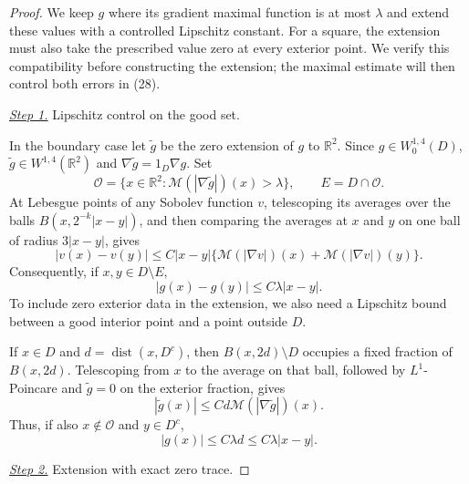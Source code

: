 \documentclass{smfart}
\theoremstyle{definition}
\newcommand{\1}{\mathbf 1}
\begin{document}
\begin{proof}
We keep $g$ where its gradient maximal function is at most $\lambda$
and extend these values with a controlled Lipschitz constant.  For a
square, the extension must also take the prescribed value zero at every
exterior point.  We verify this compatibility before constructing the
extension; the maximal estimate will then control both errors in (28).

\smallskip\noindent
\underline{\textit{Step 1.}} Lipschitz control on the good set.

In the boundary case let $\widetilde g$ be the zero extension of $g$
to $\mathbb R^2$.  Since $g\in W^{1,4}_ 0(D)$,
$\widetilde g\in W^{1,4}(\mathbb R^2)$ and
$\nabla\widetilde g=1_ D\nabla g$.  Set
\begin{equation*}
\mathcal O=\{x\in\mathbb R^2:
\mathcal M(|\nabla\widetilde g|)(x)>\lambda\},\qquad
E=D\cap\mathcal O.
\end{equation*}
At Lebesgue points of any Sobolev function $v$, telescoping its averages
over the balls $B(x,2^{-k}|x-y|)$, and then comparing the averages at
$x$ and $y$ on one ball of radius $3|x-y|$, gives
\begin{equation*}
|v(x)-v(y)|\leq C|x-y|
\{\mathcal M(|\nabla v|)(x)+\mathcal M(|\nabla v|)(y)\}.
\end{equation*}
Consequently, if $x,y\in D\setminus E$,
\begin{equation}
|g(x)-g(y)|\leq C\lambda|x-y|.
\tag{28a}
\end{equation}
To include zero exterior data in the extension, we also need a
Lipschitz bound between a good interior point and a point outside $D$.

If $x\in D$ and $d=\operatorname {dist}(x,D^c)$, then
$B(x,2d)\setminus D$ occupies a fixed fraction of $B(x,2d)$.
Telescoping from $x$ to the average on that ball, followed by
$L^1$-Poincare and $\widetilde g=0$ on the exterior fraction, gives
\begin{equation*}
|\widetilde g(x)|\leq Cd\mathcal M(|\nabla\widetilde g|)(x).
\end{equation*}
Thus, if also $x\notin\mathcal O$ and $y\in D^c$,
\begin{equation}
|g(x)|\leq C\lambda d\leq C\lambda|x-y|.
\tag{28b}
\end{equation}

\smallskip\noindent
\underline{\textit{Step 2.}} Extension with exact zero trace.


\end{proof}
\end{document}
